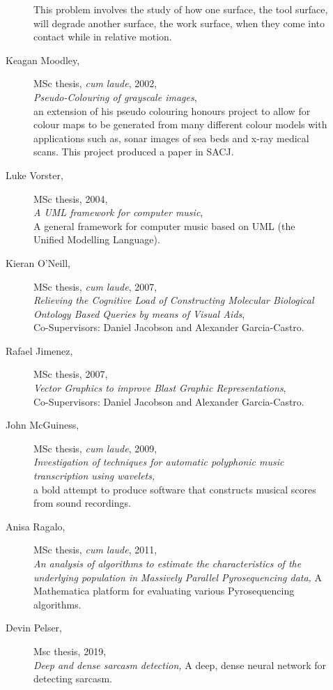 \begin{description}
\begin{description}
          This problem involves the study of how one surface, the tool surface,
          will degrade another surface, the work surface,
          when they come into contact while in relative motion.
\item[Keagan Moodley,] MSc thesis, {\em cum laude}, 2002, \\
      {\em Pseudo-Colouring of grayscale images},\\
      an extension of his pseudo colouring honours project
          to allow for colour maps to be generated from many different colour models
          with applications
          such as, sonar images of sea beds and x-ray medical scans.
          This project produced a paper in SACJ.
\item[Luke Vorster,] MSc thesis, 2004, \\
       {\em A UML framework for computer music}, \\
       A general framework for computer
          music based on UML (the Unified Modelling Language).
 
 \newpage        
\item[Kieran O'Neill,] MSc thesis, {\em cum laude}, 2007, \\
       {\it Relieving the Cognitive Load of Constructing Molecular
       Biological Ontology Based Queries by means of Visual Aids}, \\
       Co-Supervisors: Daniel Jacobson and Alexander Garcia-Castro.
\item[Rafael Jimenez,] MSc thesis, 2007, \\
       {\em Vector Graphics to improve Blast Graphic
       Representations}, \\
       Co-Supervisors: Daniel Jacobson and Alexander Garcia-Castro.
\item[John McGuiness,] MSc thesis, {\em cum laude}, 2009, \\
       {\em Investigation of techniques for automatic polyphonic
       music transcription using wavelets,} \\
       a bold attempt to produce software that constructs musical
       scores from sound recordings.
\item[Anisa Ragalo,] MSc thesis, {\em cum laude}, 2011, \\
        {\em An analysis of algorithms to estimate the characteristics 
        of the underlying population in Massively Parallel Pyrosequencing data,}
        A Mathematica platform for evaluating various Pyrosequencing algorithms.
\item[Devin Pelser,] Msc thesis, 2019, \\
        {\em Deep and dense sarcasm detection, } A deep, dense neural network for detecting sarcasm.
\end{description}
\end{description}
\newpage
\label{f0}
